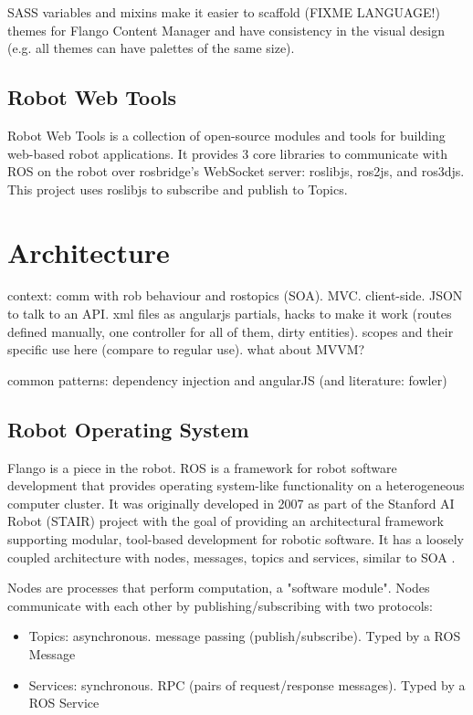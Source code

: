 SASS variables and mixins make it easier to scaffold (FIXME LANGUAGE!) themes for Flango Content Manager and have consistency in the visual design (e.g. all themes can have palettes of the same size).

\subsection{Robot Web Tools}
Robot Web Tools is a collection of open-source modules and tools for building web-based robot applications.
It provides 3 core libraries to communicate with \ac{ROS} on the robot over rosbridge's WebSocket server: roslibjs, ros2js, and ros3djs.
This project uses roslibjs to subscribe and publish to Topics.

\section{Architecture}
context: comm with rob behaviour and rostopics (SOA).
MVC. client-side. JSON to talk to an API. xml files as angularjs partials, hacks to make it work (routes defined manually, one controller for all of them, dirty entities). scopes and their specific use here (compare to regular use). what about MVVM?

common patterns:
dependency injection and angularJS (and literature: fowler)

\subsection{Robot Operating System}
Flango \cm is a piece in the robot.
\ac{ROS} is a framework for robot software development that provides operating system-like functionality on a heterogeneous computer cluster. 
It was originally developed in 2007 as part of the Stanford AI Robot (STAIR) project with the goal of providing an architectural framework supporting modular, tool-based development for robotic software.
It has a loosely coupled architecture with nodes, messages, topics and services, similar to \ac{SOA} \cite{ROS:2009}.

Nodes are processes that perform computation, a "software module". 
Nodes communicate with each other by publishing/subscribing with two protocols:
\begin{itemize}
\item Topics: asynchronous. message passing (publish/subscribe). Typed by a \ac{ROS} Message
\item Services: synchronous. \ac{RPC} (pairs of request/response messages). Typed by a \ac{ROS} Service
\end{itemize}

